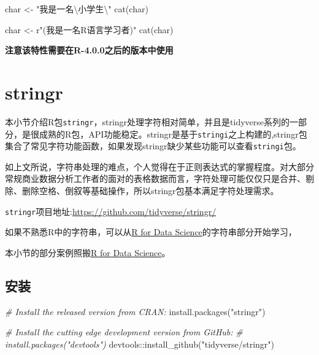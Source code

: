 \documentclass[
]{book}
\newenvironment{Shaded}{\begin{snugshade}}{\end{snugshade}}
\newcommand{\CommentTok}[1]{\textcolor[rgb]{0.56,0.35,0.01}{\textit{#1}}}
\newcommand{\FunctionTok}[1]{\textcolor[rgb]{0.00,0.00,0.00}{#1}}
\newcommand{\NormalTok}[1]{#1}
\newcommand{\OtherTok}[1]{\textcolor[rgb]{0.56,0.35,0.01}{#1}}
\newcommand{\SpecialCharTok}[1]{\textcolor[rgb]{0.00,0.00,0.00}{#1}}
\newcommand{\StringTok}[1]{\textcolor[rgb]{0.31,0.60,0.02}{#1}}
\begin{document}
\begin{Shaded}
\begin{Highlighting}[]
\NormalTok{char }\OtherTok{\textless{}{-}} \StringTok{"我是一名}\SpecialCharTok{\textbackslash{}\textquotesingle{}}\StringTok{小学生}\SpecialCharTok{\textbackslash{}\textquotesingle{}}\StringTok{"} 
\FunctionTok{cat}\NormalTok{(char)}

\NormalTok{char }\OtherTok{\textless{}{-}}\NormalTok{ r}\StringTok{"(我是一名\textquotesingle{}R语言\textquotesingle{}学习者)"}
\FunctionTok{cat}\NormalTok{(char)}
\end{Highlighting}
\end{Shaded}

\textbf{注意该特性需要在R-4.0.0之后的版本中使用}

\hypertarget{character:stringr-packages}{%
\section{stringr}\label{character:stringr-packages}}

本小节介绍R包\texttt{stringr}，stringr处理字符相对简单，并且是tidyverse系列的一部分，是很成熟的R包，API功能稳定。stringr是基于\texttt{stringi}之上构建的,stringr包集合了常见字符功能函数，如果发现stringr缺少某些功能可以查看\texttt{stringi}包。

如上文所说，字符串处理的难点，个人觉得在于正则表达式的掌握程度。对大部分常规商业数据分析工作者的面对的表格数据而言，字符处理可能仅仅只是合并、剔除、删除空格、倒叙等基础操作，所以stringr包基本满足字符处理需求。

\texttt{stringr}项目地址:\url{https://github.com/tidyverse/stringr/}

如果不熟悉R中的字符串，可以从\href{https://r4ds.had.co.nz/strings.html}{R for Data Science}的字符串部分开始学习，

本小节的部分案例照搬\href{https://r4ds.had.co.nz/strings.html}{R for Data Science}。

\hypertarget{stringr-install}{%
\subsection{安装}\label{stringr-install}}

\begin{Shaded}
\begin{Highlighting}[]
\CommentTok{\# Install the released version from CRAN:}
\FunctionTok{install.packages}\NormalTok{(}\StringTok{"stringr"}\NormalTok{)}

\CommentTok{\# Install the cutting edge development version from GitHub:}
\CommentTok{\# install.packages("devtools")}
\NormalTok{devtools}\SpecialCharTok{::}\FunctionTok{install\_github}\NormalTok{(}\StringTok{"tidyverse/stringr"}\NormalTok{)}
\end{Highlighting}
\end{Shaded}
\end{document}
